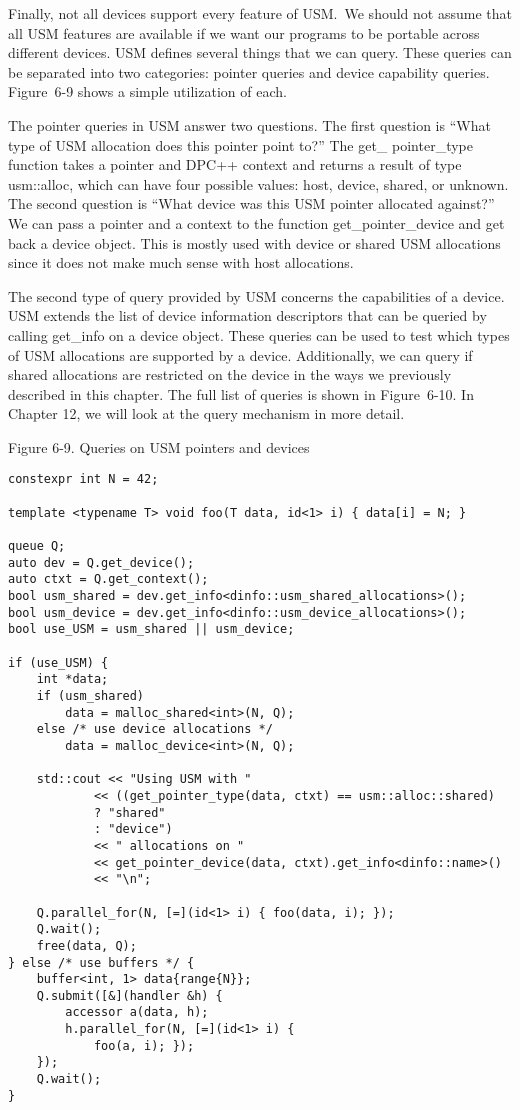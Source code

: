 Finally, not all devices support every feature of USM. We should not assume 
that all USM features are available if we want our programs to be portable 
across different devices. USM defines several things that we can query. 
These queries can be separated into two categories: pointer queries and 
device capability queries. Figure 6-9 shows a simple utilization of each.\par

The pointer queries in USM answer two questions. The first question 
is “What type of USM allocation does this pointer point to?” The get\_
pointer\_type function takes a pointer and DPC++ context and returns 
a result of type usm::alloc, which can have four possible values: host, 
device, shared, or unknown. The second question is “What device was this 
USM pointer allocated against?” We can pass a pointer and a context to the 
function get\_pointer\_device and get back a device object. This is mostly 
used with device or shared USM allocations since it does not make much 
sense with host allocations.\par

The second type of query provided by USM concerns the capabilities 
of a device. USM extends the list of device information descriptors that 
can be queried by calling get\_info on a device object. These queries can 
be used to test which types of USM allocations are supported by a device. 
Additionally, we can query if shared allocations are restricted on the device in the ways we previously described in this chapter. The full list of 
queries is shown in Figure 6-10. In Chapter 12, we will look at the query 
mechanism in more detail.\par

\hspace*{\fill} \par %
Figure 6-9. Queries on USM pointers and devices
\begin{lstlisting}[caption={}]
constexpr int N = 42;

template <typename T> void foo(T data, id<1> i) { data[i] = N; }

queue Q;
auto dev = Q.get_device();
auto ctxt = Q.get_context();
bool usm_shared = dev.get_info<dinfo::usm_shared_allocations>();
bool usm_device = dev.get_info<dinfo::usm_device_allocations>();
bool use_USM = usm_shared || usm_device;

if (use_USM) {
	int *data;
	if (usm_shared)
		data = malloc_shared<int>(N, Q);
	else /* use device allocations */
		data = malloc_device<int>(N, Q);
		
	std::cout << "Using USM with "
			<< ((get_pointer_type(data, ctxt) == usm::alloc::shared)
			? "shared"
			: "device")
			<< " allocations on "
			<< get_pointer_device(data, ctxt).get_info<dinfo::name>()
			<< "\n";
			
	Q.parallel_for(N, [=](id<1> i) { foo(data, i); });
	Q.wait();
	free(data, Q);
} else /* use buffers */ {
	buffer<int, 1> data{range{N}};
	Q.submit([&](handler &h) {
		accessor a(data, h);
		h.parallel_for(N, [=](id<1> i) {
			foo(a, i); });
	});
	Q.wait();
}
\end{lstlisting}

